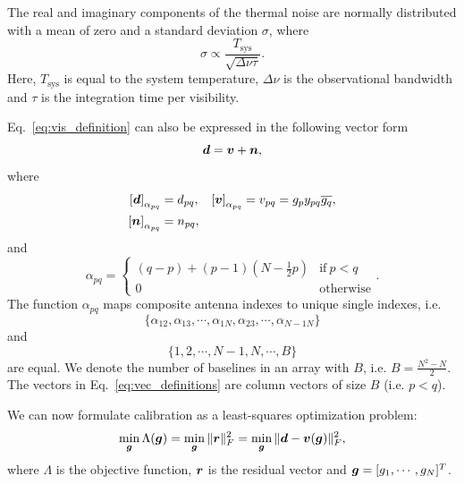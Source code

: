 \documentclass[useAMS,usenatbib]{mn2e}
\newcommand{\br}{\bmath{r}}
\newcommand{\bg}{\bmath{g}}
\newcommand{\bd}{\bmath{d}}
\newcommand{\bv}{\bmath{v}}
\newcommand{\bn}{\bmath{n}}
\newcommand{\conj}[1]{\overline{#1}}
\begin{document}
The real and imaginary components of the thermal noise are normally distributed with a mean of zero and a standard deviation $\sigma$, where   
\begin{equation}
\sigma \propto \frac{T_{\textrm{sys}}}{\sqrt{\Delta \nu \tau}}. 
\end{equation}
Here, $T_{\textrm{sys}}$ is equal to the system temperature, $\Delta \nu$ is the observational bandwidth and $\tau$ is the integration time per visibility. 

Eq.~\eqref{eq:vis_definition} can also be expressed in the following vector form 
\begin{equation}
\label{eq:vis_definition}
\bd = \bv + \bn, 
\end{equation}
where 
\begin{align}
 \left [ \bd \right]_{\alpha_{pq}} &= d_{pq}, & \left [ \bv \right ]_{\alpha_{pq}} &= v_{pq}=g_p y_{pq} \conj{g_q},\nonumber\\
 \left [ \bn \right ]_{\alpha_{pq}} &= n_{pq}, &  &\label{eq:vec_definitions}
\end{align}
and 
\begin{equation}
\alpha_{pq} =
\begin{cases}
(q-p) + (p-1)\left (N-\frac{1}{2}p \right ) & \textrm{if}~p<q\\
0 & \textrm{otherwise}
\end{cases}.
\end{equation}
The function $\alpha_{pq}$ maps composite antenna indexes to unique single indexes, i.e. 
\begin{equation}
\{\alpha_{12},\alpha_{13},\cdots,\alpha_{1N},\alpha_{23},\cdots,\alpha_{N-1N}\}
\end{equation}
and 
\begin{equation}
\{1,2,\cdots,N-1,N,\cdots,B\}
\end{equation}
are equal. We denote the number of baselines in an array with $B$, i.e. $B = \frac{N^2-N}{2}$. The vectors in Eq.~\eqref{eq:vec_definitions} are column vectors of size $B$ (i.e. $p<q$).

We can now formulate calibration as a least-squares optimization problem:
\begin{equation}
\label{eq:least_squares}
\min_{\bg} \Lambda(\bg) = \min_{\bg} \|\br\|_F^2 = \min_{\bg} \|\bd - \bv(\bg)\|_F^2, 
\end{equation}
where $\Lambda$ is the objective function, $\br$ is the residual vector and $\bg =[g_1,\cdots,g_N]^T$.
\end{document}
